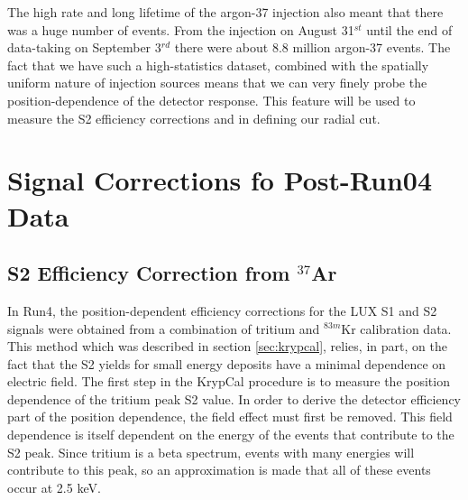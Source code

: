 The high rate and long lifetime of the argon-37 injection also meant that there was a huge number of events. From the injection on August 31$^{st}$ until the end of data-taking on September 3$^{rd}$ there were about 8.8 million argon-37 events. The fact that we have such a high-statistics dataset, combined with the spatially uniform nature of injection sources means that we can very finely probe the position-dependence of the detector response. This feature will be used to measure the S2 efficiency corrections and in defining our radial cut.


\section{Signal Corrections fo Post-Run04 Data}

\subsection{S2 Efficiency Correction from $^{37}$Ar}\label{sec:s2corr}
In Run4, the position-dependent efficiency corrections for the LUX S1 and S2 signals were obtained from a combination of tritium and $^{83m}$Kr calibration data. This method which was described in section \ref{sec:krypcal}, relies, in part, on the fact that the S2 yields for small energy deposits have a minimal dependence on electric field. The first step in the KrypCal procedure is to measure the position dependence of the tritium peak S2 value. In order to derive the detector efficiency part of the position dependence, the field effect must first be removed. This field dependence is itself dependent on the energy of the events that contribute to the S2 peak. Since tritium is a beta spectrum, events with many energies will contribute to this peak, so an approximation is made that all of these events occur at 2.5 keV.


